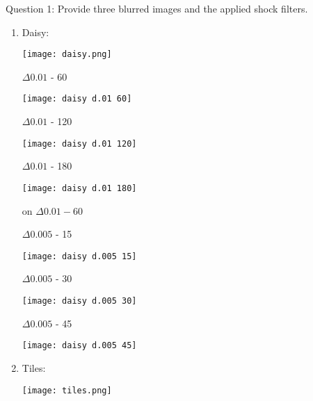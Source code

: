 \item Question 1: Provide three blurred images and the applied shock filters.

\begin{enumerate}
  \item Daisy:

  \begin{center}
    \texttt{[image: daisy.png]}
  \end{center}


    \begin{multicols}{3}
    \begin{center}

    $\Delta 0.01$ - 60

    \texttt{[image: daisy d.01 60]}

    $\Delta 0.01$ - 120

    \texttt{[image: daisy d.01 120]}

    $\Delta 0.01$ - 180

    \texttt{[image: daisy d.01 180]}
  \end{center}
  \end{multicols}

   on $\Delta 0.01 - 60$

  \begin{multicols}{3}
  \begin{center}

    $\Delta 0.005$ - 15

    \texttt{[image: daisy d.005 15]}

    $\Delta 0.005$ - 30

    \texttt{[image: daisy d.005 30]}

    $\Delta 0.005$ - 45

    \texttt{[image: daisy d.005 45]}
  \end{center}
  \end{multicols}

  \item Tiles:

  \begin{center}
    \texttt{[image: tiles.png]}
  \end{center}


    \begin{multicols}{3}
    \begin{center}


\end{center}
\end{multicols}
\end{enumerate}
